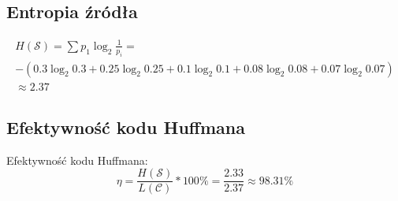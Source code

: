\documentclass[12pt]{article}
\begin{document}
\subsection*{Entropia źródła}

\begin{multline*}
    H(\mathcal{S}) = \sum p_1 \log_2 \frac{1}{p_i} =\\
    -(0.3 \log_2 0.3 + 0.25 \log_2 0.25 + 0.1 \log_2 0.1 + 0.08 \log_2 0.08 + 0.07 \log_2 0.07 )\\
    \approx 2.37 
\end{multline*}

\subsection*{Efektywność kodu Huffmana}
 
Efektywność kodu Huffmana:
$$\eta = \frac{H(\mathcal{S})}{L(\mathcal{C})}* 100\% = \frac{2.33}{2.37} \approx 98.31 \% $$ 
\end{document}
